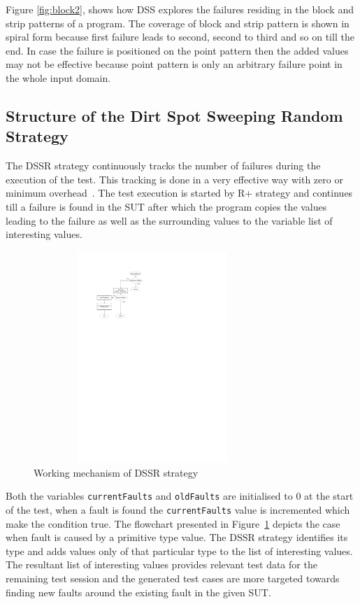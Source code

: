 \documentclass[conference]{IEEEtran}
\begin{document}
Figure \ref{fig:block2}, shows how DSS explores the failures residing in the block and strip patterns of a program. The coverage of block and strip pattern is shown in spiral form because first failure leads to second, second to third and so on till the end. In case the failure is positioned on the point pattern then the added values may not be effective because point pattern is only an arbitrary failure point in the whole input domain.

\subsection{Structure of the Dirt Spot Sweeping Random Strategy}
The DSSR strategy continuously tracks the number of failures during the execution of the test. This tracking is done in a very effective way with zero or minimum overhead~\cite{Leitner2009}. The test execution is started by R+ strategy and continues till a failure is found in the SUT after which the program copies the values leading to the failure as well as the surrounding values to the variable list of interesting values. 

\begin{figure}[ht]
\centering
\includegraphics[width= 9cm,height=8cm]{flowchart4.pdf}
\caption{Working mechanism of DSSR strategy}
\label{fig:Working_DSSS}
\end{figure}

Both the variables \verb+currentFaults+ and \verb+oldFaults+ are initialised to 0 at the start of the test, when a fault is found the \verb+currentFaults+ value is incremented which make the condition true. The flowchart presented in Figure~\ref{fig:Working_DSSS} depicts the case when fault is caused by a primitive type value. The DSSR strategy identifies its type and adds values only of that particular type to the list of interesting values. The resultant list of interesting values provides relevant test data for the remaining test session and the generated test cases are more targeted towards finding new faults around the existing fault in the given SUT.
\end{document}
